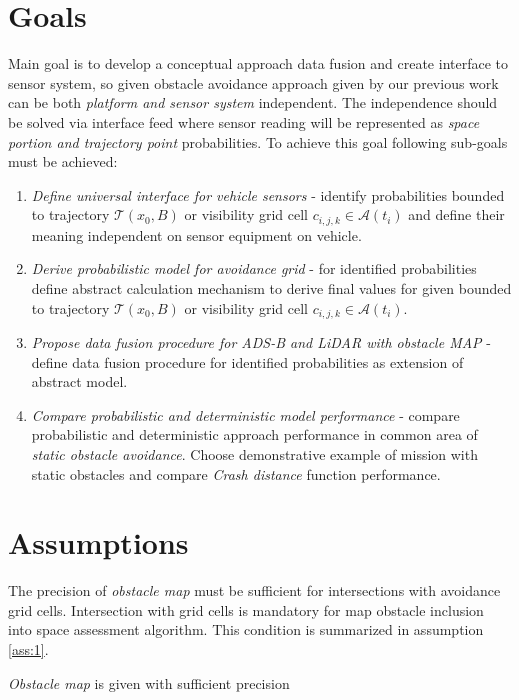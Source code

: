 \section{Goals}
\noindent Main goal is to develop a conceptual approach data fusion and create interface to sensor system, so given obstacle avoidance approach given by our previous work can be both \emph{platform and sensor system} independent. The independence should be solved via interface feed where sensor reading will be represented as \emph{space portion and trajectory point} probabilities. To achieve this goal following sub-goals must be achieved:
\begin{enumerate}
    \item \textit{Define universal interface for vehicle sensors} - identify probabilities bounded to trajectory $\mathscr{T}(x_0,B)$ or visibility grid cell $c_{i,j,k}\in\mathscr{A}(t_i)$ and define their meaning independent on sensor equipment on vehicle.
    \item \textit{Derive probabilistic model for avoidance grid} - for identified probabilities define abstract calculation mechanism to derive final values for given bounded to trajectory $\mathscr{T}(x_0,B)$ or visibility grid cell $c_{i,j,k}\in\mathscr{A}(t_i)$.
    \item \textit{Propose data fusion procedure for ADS-B and LiDAR with obstacle MAP} - define data fusion procedure for identified probabilities as extension of abstract model.
    \item \textit{Compare probabilistic and deterministic model performance} - compare probabilistic and deterministic approach performance in common area of \textit{static obstacle avoidance}. Choose demonstrative example of mission with static obstacles and compare \textit{Crash distance} function performance.
\end{enumerate}

\section{Assumptions}
\noindent The precision of \emph{obstacle map} must be sufficient for intersections with avoidance grid cells. Intersection with grid cells is mandatory for map obstacle inclusion into space assessment algorithm. This condition is summarized in assumption \ref{ass:1}.
\begin{assumption}\label{ass:1}\textit{Obstacle map} is given with sufficient precision\end{assumption}

